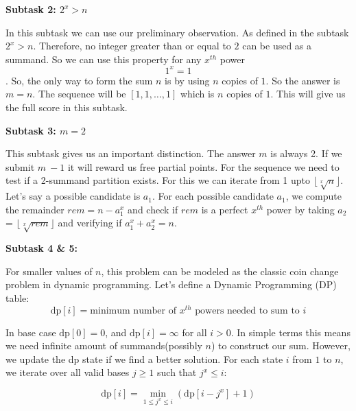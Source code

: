 \documentclass[12pt]{article}
\begin{document}
\vspace{0.3cm}

\textbf{\large Subtask 2: $2^x > n$}

\vspace{0.3cm}

In this subtask we can use our preliminary observation.  As defined in the subtask $2^x > n$. Therefore, no integer greater than or equal to $2$ can be used as a summand. So we can  use this property for any $x^{th}$ power 
$$1^x = 1$$.
So, the only way to form the sum $n$ is by using $n$ copies of $1$. So the answer is $m=n$.  The sequence will be  $[1, 1, \dots, 1]$ which is $n$ copies of $1$. This will give us the full score in this subtask. 

\vspace{0.3cm}

\textbf{\large Subtask 3: $m=2$}

\vspace{0.3cm}

This subtask gives us an important distinction. The answer $m$ is always 2.  If we submit $m \ -1$ it will reward us free partial points. For the sequence we need to test if a 2-summand partition exists. For this we can iterate from 1 upto $\lfloor \sqrt[x]{n} \rfloor$.  Let's say a possible candidate is $a_1$. For each possible candidate $a_1$, we compute the remainder $rem = n - a_1^x$ and check if $rem$ is a perfect $x^{th}$ power by taking $a_2 $= $\lfloor \sqrt[x]{rem} \rfloor $ and verifying if $a_1^x + a_2^x = n$.

\vspace{0.3cm}


\textbf{\large Subtask 4 \& 5:}

\vspace{0.3cm}

For smaller values of $n$, this problem can be modeled as the classic coin change problem in dynamic programming.  Let's define a Dynamic Programming (DP) table:
$$\text{dp}[i] = \text{minimum number of } x^{th}\text{ powers needed to sum to } i$$


In base case $\text{dp}[0] = 0$, and $\text{dp}[i] = \infty$ for all $i > 0$. In simple terms this means we need infinite amount of summands(possibly $n$) to construct our sum. However, we update the dp state if we find a better solution. For each state $i$ from $1$ to $n$, we iterate over all valid bases $j \ge 1$ such that $j^x \le i$:

 $$\text{dp}[i]=\min_{1\le j^{x} \le i}(\text{dp}[i-j^{x}]+1)$$
\end{document}
